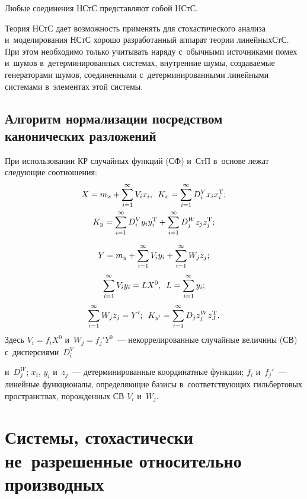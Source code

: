 \begin{multicols}{2}
Любые соединения НСтС представляют собой НСтС.

Теория НСтС дает возможность применять для стохастического анализа и~моделирования 
НСтС хорошо разработанный аппарат теории линейных\linebreak СтС. 
При этом необходимо только учитывать наряду с~обычными источниками 
помех и~шумов в~детерминированных сис\-те\-мах, внут\-рен\-ние шумы, 
создаваемые генераторами шумов, соединенными с~\mbox{детерминированными} 
линейными системами в~элементах этой сис\-темы.

\subsection{Алгоритм нормализации посредством канонических разложений} 

При использовании КР случайных функций (СФ)
 и~СтП в~основе лежат сле\-ду\-ющие соотношения:
    \begin{multline*}
    X=m_x + \sum\limits_{i=1}^\infty V_i x_i, \enskip K_x =\sum\limits_{i=1}^\infty D_i^V x_i x_i^{\mathrm{T}};
    \\
K_y =\sum\limits_{i=1}^\infty D_i^V y_iy_i^{\mathrm{T}} +\sum\limits_{i=1}^\infty D_j^W z_j z_j^{\mathrm{T}};
\end{multline*}

\noindent
\begin{equation*}
Y=m_y +\sum\limits_{i=1}^\infty V_i y_i +\sum\limits_{i=1}^\infty W_j z_j;
\end{equation*}
\begin{equation*}
\sum\limits_{i=1}^\infty V_iy_i = LX^0,\enskip L= \sum\limits_{i=1}^\infty y_i;
\end{equation*}
\begin{equation*}
\sum\limits_{i=1}^\infty W_j z_j = Y';\enskip K_{y'} =\sum\limits_{i=1}^\infty D_j z_j^W z_J^{\mathrm{T}}.
\end{equation*}
Здесь $V_i = f_iX^0$ и~$W_j=f_j'Y^0$~--- некоррелированные случайные величины (СВ) с~дисперсиями~$D_i^V$\linebreak\vspace*{-12pt}

\pagebreak

\noindent
и~$D_j^W$; 
$x_i$, $y_i$ и~$z_j$~--- детерминированные координатные функции; $f_i$ и~$f_j'$~--- 
линейные функционалы, определяющие базисы в~соответствующих гильбертовых пространствах,
 порожденных СВ $V_i$ и~$W_j$.

\section{Системы, стохастически не~разрешенные относительно производных}


\end{multicols}
